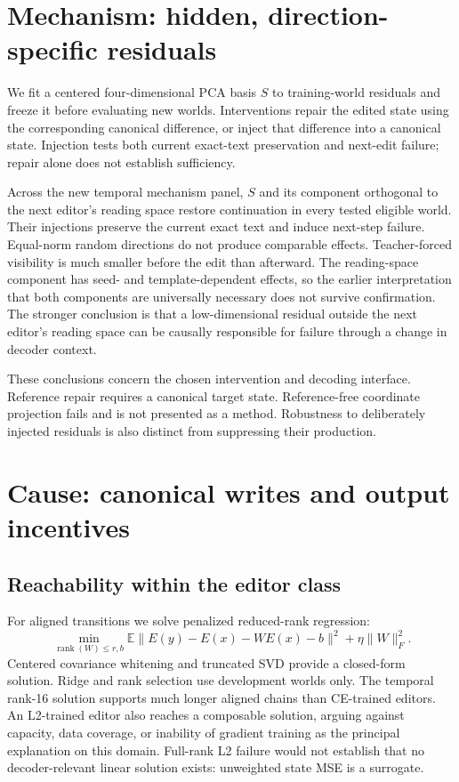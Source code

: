 \documentclass[11pt]{article}
\begin{document}
\section{Mechanism: hidden, direction-specific residuals}
We fit a centered four-dimensional PCA basis $S$ to training-world residuals
and freeze it before evaluating new worlds. Interventions repair the edited
state using the corresponding canonical difference, or inject that difference
into a canonical state. Injection tests both current exact-text preservation
and next-edit failure; repair alone does not establish sufficiency.

Across the new temporal mechanism panel, $S$ and its component orthogonal to the
next editor's reading space restore continuation in every tested eligible
world. Their injections preserve the current exact text and induce next-step
failure. Equal-norm random directions do not produce comparable effects.
Teacher-forced visibility is much smaller before the edit than afterward.
The reading-space component has seed- and template-dependent effects, so the
earlier interpretation that both components are universally necessary does
not survive confirmation. The stronger conclusion is that a low-dimensional
residual outside the next editor's reading space can be causally responsible
for failure through a change in decoder context.

These conclusions concern the chosen intervention and decoding interface.
Reference repair requires a canonical target state. Reference-free coordinate
projection fails and is not presented as a method. Robustness to deliberately
injected residuals is also distinct from suppressing their production.

\section{Cause: canonical writes and output incentives}
\subsection{Reachability within the editor class}
For aligned transitions we solve penalized reduced-rank regression:
\begin{equation}
 \min_{\operatorname{rank}(W)\leq r,b}
 \mathbb E\|E(y)-E(x)-WE(x)-b\|^2+\eta\|W\|_F^2.
\end{equation}
Centered covariance whitening and truncated SVD provide a closed-form
solution. Ridge and rank selection use development worlds only. The temporal
rank-16 solution supports much longer aligned chains than CE-trained editors.
An L2-trained editor also reaches a composable solution, arguing against
capacity, data coverage, or inability of gradient training as the principal
explanation on this domain. Full-rank L2 failure would not establish that no
decoder-relevant linear solution exists: unweighted state MSE is a surrogate.
\end{document}
